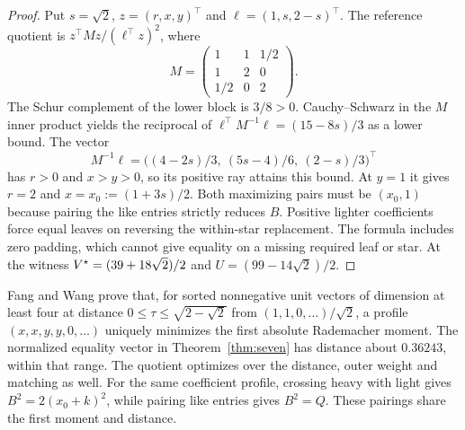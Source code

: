 \begin{proof}
Put $s=\sqrt2$, $z=(r,x,y)^\top$ and $\ell=(1,s,2-s)^\top$.
The reference quotient is $z^\top M z/(\ell^\top z)^2$, where
\[
 M=\begin{pmatrix}1&1&1/2\\1&2&0\\1/2&0&2\end{pmatrix}.
\]
The Schur complement of the lower block is $3/8>0$.
Cauchy--Schwarz in the $M$ inner product yields the reciprocal of
$\ell^\top M^{-1}\ell=(15-8s)/3$ as a lower bound. The vector
\[
 M^{-1}\ell=\bigl((4-2s)/3,\ (5s-4)/6,\ (2-s)/3\bigr)^\top
\]
has $r>0$ and $x>y>0$, so its positive ray attains this bound. At
$y=1$ it gives $r=2$ and $x=x_0:=(1+3s)/2$. Both maximizing
pairs must be $(x_0,1)$ because pairing the like entries strictly
reduces $B$. Positive lighter coefficients force equal leaves
on reversing the within-star replacement. The formula includes
zero padding, which cannot give equality on a missing required
leaf or star. At the witness
$V^\star=(39+18\sqrt2)/2$ and $U=(99-14\sqrt2)/2$.
\end{proof}

Fang and Wang \cite[Theorem 1]{fangwang} prove that, for sorted
nonnegative unit vectors of dimension at least four at distance
$0\le\tau\le\sqrt{2-\sqrt2}$ from $(1,1,0,\ldots)/\sqrt2$,
a profile $(x,x,y,y,0,\ldots)$ uniquely minimizes the first absolute
Rademacher moment. The normalized equality vector in
Theorem~\ref{thm:seven} has distance about $0.36243$, within that
range. The quotient optimizes over the distance, outer weight and
matching as well. For the same coefficient profile, crossing
heavy with light gives $B^2=2(x_0+k)^2$, while pairing like entries
gives $B^2=Q$. These pairings share the first moment and distance.

